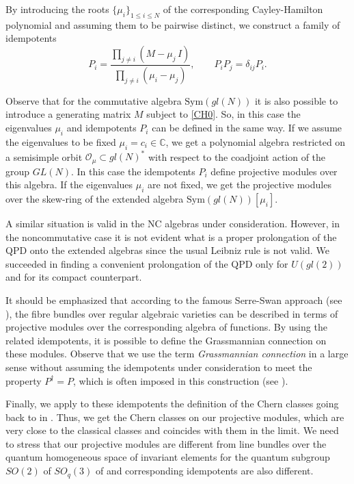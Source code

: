\documentclass[11pt]{article}
\newcommand{\C}{\mathbb{C}}
\numberwithin{equation}{section}
\theoremstyle{plain}
\theoremstyle{definition}
\begin{document}
By introducing the roots $\{\mu_i\}_{1\leq i\leq N}$ of the corresponding Cayley-Hamilton polynomial and assuming them to be pairwise
distinct, we construct a family of idempotents
\begin{equation}
P_i=\frac{\prod_{j\not=i} (M-\mu_j\, I)}{\prod_{j\not=i}(\mu_i-\mu_j)}, \qquad P_iP_j = \delta_{ij}P_i.
\label{Idem}
\end{equation}

Observe that for  the commutative algebra $\mathrm{Sym}(gl(N))$ it is also possible to introduce a  generating matrix $M$
subject to \eqref{CH0}. So, in this case  the eigenvalues $\mu_i$ and  idempotents $P_i$ can be defined in the same way. If we assume
the eigenvalues to be fixed $\mu_i=c_i\in \C$, we get a polynomial algebra restricted on a semisimple orbit 
$\mathcal{O}_\mu\subset gl(N)^*$ with respect to the coadjoint action of the group $GL(N)$. In this case the idempotents $P_i$ define projective modules over this algebra. If the eigenvalues $\mu_i$
are not fixed, we get the projective modules  over the skew-ring of  the extended algebra $\mathrm{Sym}(gl(N))[\mu_i]$.

A similar situation is valid in the NC algebras under consideration. However, in the noncommutative case it is not evident what is a
proper prolongation of the QPD onto the extended algebras since the usual Leibniz rule is not valid. We succeeded in finding a
convenient prolongation of the QPD only for $U(gl(2))$ and for its compact counterpart.

It should be emphasized that according to the famous Serre-Swan approach (see \cite{Se, Sw}), the fibre bundles over 
regular algebraic varieties can be described in terms of projective modules over the corresponding algebra of functions. By using the related
idempotents, it is possible to define the Grassmannian connection on these modules. Observe that we use the term {\em Grassmannian connection} in a large sense without assuming the idempotents under consideration  to meet the property $P^\dag=P$, which is often imposed in this construction (see \cite{La}).

Finally, we apply to these idempotents the definition of the Chern classes going back to in \cite{Gom}. Thus, we get the Chern classes on our projective modules, which are very close to the classical classes and coincides with them in the limit. We need to stress that our projective modules are different from  line bundles over the quantum homogeneous space of invariant elements for the quantum subgroup $SO(2)$ of $SO_q(3)$ of \cite{LaPa} and corresponding idempotents are also different.
\end{document}
